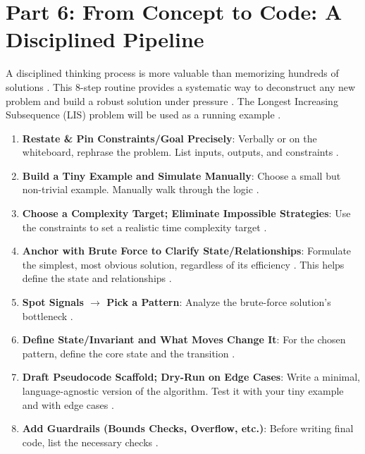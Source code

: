 \documentclass{article}
\begin{document}
\section{Part 6: From Concept to Code: A Disciplined Pipeline}
A disciplined thinking process is more valuable than memorizing hundreds of solutions \cite{1227}. This 8-step routine provides a systematic way to deconstruct any new problem and build a robust solution under pressure \cite{1228}. The Longest Increasing Subsequence (LIS) problem will be used as a running example \cite{1229}.
\begin{enumerate}
\item \textbf{Restate \& Pin Constraints/Goal Precisely}: Verbally or on the whiteboard, rephrase the problem. List inputs, outputs, and constraints \cite{1232}.
\item \textbf{Build a Tiny Example and Simulate Manually}: Choose a small but non-trivial example. Manually walk through the logic \cite{1235}.
\item \textbf{Choose a Complexity Target; Eliminate Impossible Strategies}: Use the constraints to set a realistic time complexity target \cite{1242}.
\item \textbf{Anchor with Brute Force to Clarify State/Relationships}: Formulate the simplest, most obvious solution, regardless of its efficiency \cite{1247}. This helps define the state and relationships \cite{1247}.
\item \textbf{Spot Signals $\rightarrow$ Pick a Pattern}: Analyze the brute-force solution's bottleneck \cite{1255}.
\item \textbf{Define State/Invariant and What Moves Change It}: For the chosen pattern, define the core state and the transition \cite{1262}.
\item \textbf{Draft Pseudocode Scaffold; Dry-Run on Edge Cases}: Write a minimal, language-agnostic version of the algorithm. Test it with your tiny example and with edge cases \cite{1275}.
\item \textbf{Add Guardrails (Bounds Checks, Overflow, etc.)}: Before writing final code, list the necessary checks \cite{1297}.
\end{enumerate}
\end{document}
